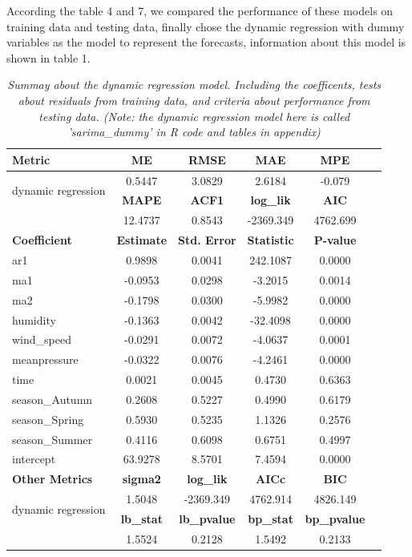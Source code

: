 \documentclass[12pt]{article}
\begin{document}
According the table 4 and 7, we compared the performance of these models on
training data and testing data, finally chose the dynamic regression with dummy variables
as the model to represent the forecasts, information about this model is shown 
in table 1.
\begin{table}[!h]
    \centering
    \captionsetup{font=small} %
    \caption{\textit{Summay about the dynamic regression model.
    Including the coefficents, tests about residuals from training data,
    and criteria about performance from testing data.
    (Note: the dynamic regression model here is called 'sarima\_dummy' in R code
     and tables in appendix)}}
    \label{tab:model_summary_combined}
    \begin{tabular}{lccccc}
    \toprule
    \textbf{Metric} & \textbf{ME} & \textbf{RMSE} & \textbf{MAE} & \textbf{MPE} \\
    \midrule
    \multirow{2}{*}{dynamic regression}
        & 0.5447 & 3.0829 & 2.6184 & -0.079 \\
        \cmidrule{2-5}
        & \textbf{MAPE} & \textbf{ACF1} & \textbf{log\_lik} & \textbf{AIC} \\
    \cmidrule{2-5}
        & 12.4737 & 0.8543 & -2369.349 & 4762.699 \\
    \midrule
    \textbf{Coefficient} & \textbf{Estimate} & \textbf{Std. Error} & \textbf{Statistic} & \textbf{P-value} \\
    \cmidrule{1-5}
    ar1            & 0.9898  & 0.0041 & 242.1087 & 0.0000 \\
    ma1            & -0.0953 & 0.0298 & -3.2015  & 0.0014 \\
    ma2            & -0.1798 & 0.0300 & -5.9982  & 0.0000 \\
    humidity       & -0.1363 & 0.0042 & -32.4098 & 0.0000 \\
    wind\_speed    & -0.0291 & 0.0072 & -4.0637  & 0.0001 \\
    meanpressure   & -0.0322 & 0.0076 & -4.2461  & 0.0000 \\
    time           & 0.0021  & 0.0045 & 0.4730   & 0.6363 \\
    season\_Autumn & 0.2608  & 0.5227 & 0.4990   & 0.6179 \\
    season\_Spring & 0.5930  & 0.5235 & 1.1326   & 0.2576 \\
    season\_Summer & 0.4116  & 0.6098 & 0.6751   & 0.4997 \\
    intercept      & 63.9278 & 8.5701 & 7.4594   & 0.0000 \\
    \midrule
    \textbf{Other Metrics} & \textbf{sigma2} & \textbf{log\_lik} & \textbf{AICc} & \textbf{BIC} \\
    \cmidrule{1-5}
    \multirow{2}{*}{dynamic regression} & 1.5048 & -2369.349 & 4762.914 & 4826.149  \\
    \cmidrule{2-5}
     & \textbf{lb\_stat} & \textbf{lb\_pvalue} & \textbf{bp\_stat} & \textbf{bp\_pvalue} \\
     \cmidrule{2-5}
     & 1.5524 & 0.2128 & 1.5492 & 0.2133 \\
    \bottomrule
    \end{tabular}
\end{table}
\end{document}
